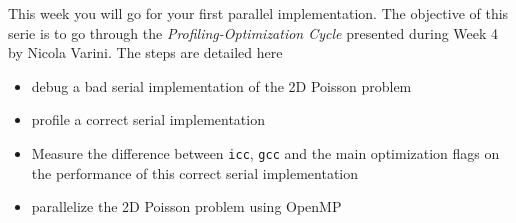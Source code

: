 \documentclass[11pt,a4paper]{article}
\begin{document}

\noindent
This week you will go for your first parallel implementation. The objective of this serie is to go through the {\it Profiling-Optimization Cycle} presented during Week 4 by Nicola Varini. The steps are detailed here

\begin{itemize}
\item {debug a bad serial implementation of the 2D Poisson problem}
\item {profile a correct serial implementation}
\item {Measure the difference between {\tt icc}, {\tt gcc} and the main optimization flags on the performance of this correct serial implementation}
\item {parallelize the 2D Poisson problem using OpenMP}
\end{itemize}

\end{document}

